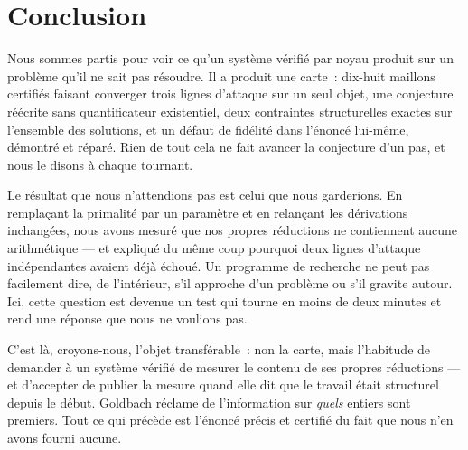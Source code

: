 \documentclass[11pt]{article}
\theoremstyle{remark}\newtheorem{remarque}{Remarque}
\begin{document}
\section{Conclusion}

Nous sommes partis pour voir ce qu'un système vérifié par noyau produit sur un problème
qu'il ne sait pas résoudre. Il a produit une carte~: dix-huit maillons certifiés faisant
converger trois lignes d'attaque sur un seul objet, une conjecture réécrite sans
quantificateur existentiel, deux contraintes structurelles exactes sur l'ensemble des
solutions, et un défaut de fidélité dans l'énoncé lui-même, démontré et réparé. Rien de
tout cela ne fait avancer la conjecture d'un pas, et nous le disons à chaque tournant.

Le résultat que nous n'attendions pas est celui que nous garderions. En remplaçant la
primalité par un paramètre et en relançant les dérivations inchangées, nous avons mesuré
que nos propres réductions ne contiennent aucune arithmétique --- et expliqué du même coup
pourquoi deux lignes d'attaque indépendantes avaient déjà échoué. Un programme de
recherche ne peut pas facilement dire, de l'intérieur, s'il approche d'un problème ou s'il
gravite autour. Ici, cette question est devenue un test qui tourne en moins de deux
minutes et rend une réponse que nous ne voulions pas.

C'est là, croyons-nous, l'objet transférable~: non la carte, mais l'habitude de demander à
un système vérifié de mesurer le contenu de ses propres réductions --- et d'accepter de
publier la mesure quand elle dit que le travail était structurel depuis le début. Goldbach
réclame de l'information sur \emph{quels} entiers sont premiers. Tout ce qui précède est
l'énoncé précis et certifié du fait que nous n'en avons fourni aucune.



\end{document}
